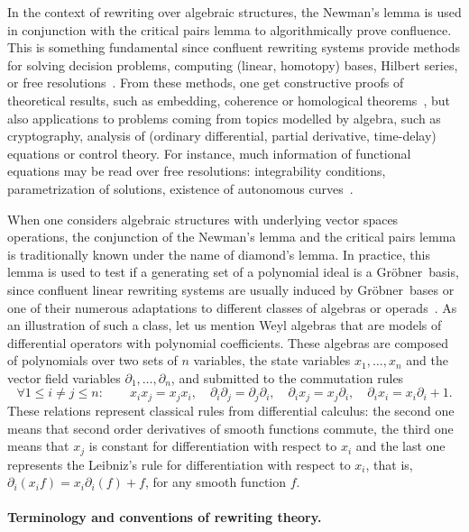\documentclass[10pt]{easychair}
\theoremstyle{definition}
\newcommand\G{Gröbner}
\begin{document}
In the context of rewriting over algebraic structures, the Newman's lemma
is used in conjunction with the critical pairs lemma to algorithmically
prove confluence. This is something fundamental since confluent rewriting
systems provide methods for solving decision problems, computing (linear,
homotopy) bases, Hilbert series, or free
resolutions~\cite{MR846601, MR2964639, MR1072284, MR1360005}. From these 
methods, one get constructive proofs of theoretical results, such as 
embedding, coherence or homological theorems~\cite{MR506890, MR0506423,
  MR3347996, MR3742562, MR265437, MR920522}, but also applications to 
problems coming from topics modelled by algebra, such as cryptography, 
analysis of (ordinary differential, partial derivative, time-delay) 
equations or control theory. For instance, much information of 
functional equations may be read over free resolutions: integrability
conditions, parametrization of solutions, existence of autonomous
curves~\cite{MR2233761, MR1308976}.
\medskip

When one considers algebraic structures with underlying vector spaces
operations, the conjunction of the Newman's lemma and the critical pairs lemma
is traditionally known under the name of diamond's lemma. In practice, this
lemma is used to test if a generating set of a polynomial ideal is a \G\ basis,
since confluent linear rewriting systems are usually induced by \G\ bases or one
of their numerous adaptations to different classes of algebras or
operads~\cite{MR506890, MR2202562, MR2667136, MR1044911, MR1299371}. As an
illustration of such a class, let us mention Weyl algebras that are models of
differential operators with polynomial coefficients. These algebras are composed
of polynomials over two sets of $n$ variables, the state variables
$x_1,\ldots,x_n$ and the vector field variables $\partial_1,\ldots,\partial_n$, and submitted to the
commutation rules
\[ \forall 1\leq i\neq j\leq n: \qquad x_ix_j=x_jx_i,
  \quad \partial_i\partial_j=\partial_j\partial_i, \quad \partial_ix_j=x_j\partial_i, \quad
\partial_ix_i=x_i\partial_i+1. \]
These relations represent classical rules from differential calculus: the
second one means that second order derivatives of smooth functions
commute, the third one means that $x_j$ is constant for differentiation
with respect to $x_i$ and the last one represents the Leibniz's rule for
differentiation with respect to $x_i$, that is,
$\partial_i(x_if)=x_i\partial_i(f)+f$, for any smooth function $f$.
\medskip

\paragraph{Terminology and conventions of rewriting theory.}
\end{document}
